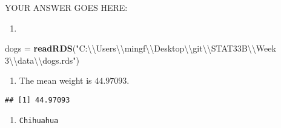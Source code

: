 \documentclass[
]{article}
\newenvironment{Shaded}{\begin{snugshade}}{\end{snugshade}}
\newcommand{\CharTok}[1]{\textcolor[rgb]{0.31,0.60,0.02}{#1}}
\newcommand{\DataTypeTok}[1]{\textcolor[rgb]{0.13,0.29,0.53}{#1}}
\newcommand{\DecValTok}[1]{\textcolor[rgb]{0.00,0.00,0.81}{#1}}
\newcommand{\KeywordTok}[1]{\textcolor[rgb]{0.13,0.29,0.53}{\textbf{#1}}}
\newcommand{\NormalTok}[1]{#1}
\newcommand{\OperatorTok}[1]{\textcolor[rgb]{0.81,0.36,0.00}{\textbf{#1}}}
\newcommand{\OtherTok}[1]{\textcolor[rgb]{0.56,0.35,0.01}{#1}}
\newcommand{\StringTok}[1]{\textcolor[rgb]{0.31,0.60,0.02}{#1}}
\providecommand{\tightlist}{%
  \setlength{\itemsep}{0pt}\setlength{\parskip}{0pt}}
\begin{document}
YOUR ANSWER GOES HERE:

\begin{enumerate}
\def\labelenumi{\arabic{enumi}.}
\tightlist
\item
\end{enumerate}

\begin{Shaded}
\begin{Highlighting}[]
\NormalTok{dogs =}\StringTok{ }\KeywordTok{readRDS}\NormalTok{(}\StringTok{"C:}\CharTok{\textbackslash{}\textbackslash{}}\StringTok{Users}\CharTok{\textbackslash{}\textbackslash{}}\StringTok{mingf}\CharTok{\textbackslash{}\textbackslash{}}\StringTok{Desktop}\CharTok{\textbackslash{}\textbackslash{}}\StringTok{git}\CharTok{\textbackslash{}\textbackslash{}}\StringTok{STAT33B}\CharTok{\textbackslash{}\textbackslash{}}\StringTok{Week 3}\CharTok{\textbackslash{}\textbackslash{}}\StringTok{data}\CharTok{\textbackslash{}\textbackslash{}}\StringTok{dogs.rds"}\NormalTok{)}
\end{Highlighting}
\end{Shaded}

\begin{enumerate}
\def\labelenumi{\arabic{enumi}.}
\setcounter{enumi}{1}
\tightlist
\item
  The mean weight is \(44.97093\).
\end{enumerate}

\begin{Shaded}
\end{Shaded}

\begin{verbatim}
## [1] 44.97093
\end{verbatim}

\begin{enumerate}
\def\labelenumi{\arabic{enumi}.}
\setcounter{enumi}{2}
\tightlist
\item
  \texttt{Chihuahua}
\end{enumerate}

\begin{Shaded}
\end{Shaded}
\end{document}
